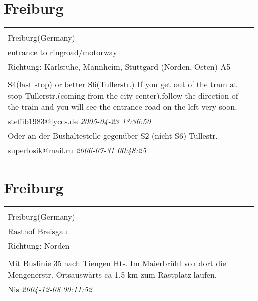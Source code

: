 \documentclass[a4paper,12pt]{article}
\begin{document}
\section{Freiburg}
\begin{tabular}{|p{13cm}|}
\hline\\
Freiburg(Germany)\\
entrance to ringroad/motorway\\
Richtung: Karlsruhe, Mannheim, Stuttgard (Norden, Osten) A5 \\
\hline\\
S4(last stop) or better S6(Tullerstr.)
If you get out of the tram at stop Tullerstr.(coming from the city center),follow the direction of the train and you will see the entrance road on the left very soon. \\
steffib1983@lycos.de \textit{ 2005-04-23 18:36:50 }\\\hline Oder an der Bushaltestelle gegenüber S2 (nicht S6) Tullestr. \\
superlosik@mail.ru \textit{ 2006-07-31 00:48:25 }\\\hline
\end{tabular}


\section{Freiburg}
\begin{tabular}{|p{13cm}|}
\hline\\
Freiburg(Germany)\\
Rasthof Breisgau\\
Richtung: Norden \\
\hline\\
Mit Buslinie 35 nach Tiengen Hts. Im Maierbrühl von dort die Mengenerstr. Ortsauswärts ca 1.5 km zum Rastplatz laufen. \\
Nis \textit{ 2004-12-08 00:11:52 }\\\hline
\end{tabular}
\end{document}
